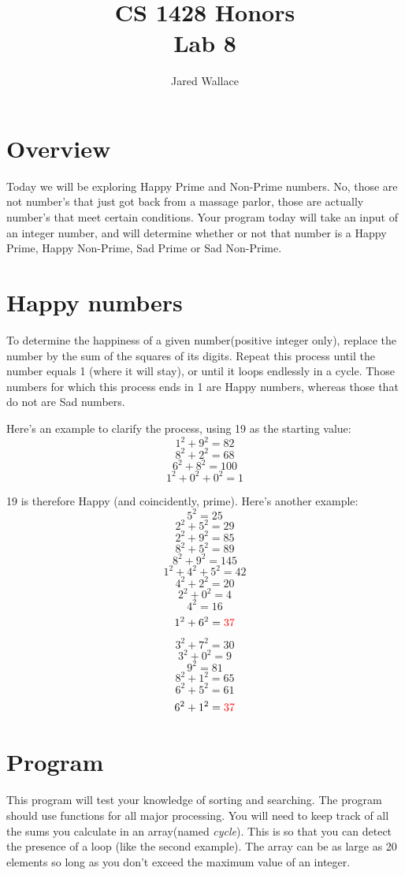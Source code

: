 \documentclass[letterpaper,12pt]{article}
\title{\Large CS 1428 Honors\\Lab 8}
\author{Jared Wallace}
\date{}
\begin{document}
\maketitle

\vspace{30mm}

\section*{Overview}
Today we will be exploring Happy Prime and Non-Prime numbers. No, those are not number's that
just got back from a massage parlor, those are actually number's that meet certain
conditions. Your program today will take an input of an integer number, and will
determine whether or not that number is a Happy Prime, Happy Non-Prime,
Sad Prime or Sad Non-Prime.

\section*{Happy numbers}
To determine the happiness of a given number(positive integer only), replace the number
by the sum of the squares of its digits. Repeat this process until the number equals 1
(where it will stay), or until it loops endlessly in a cycle. Those numbers for which
this process ends in 1 are Happy numbers, whereas those that do not are Sad numbers.

Here's an example to clarify the process, using 19 as the starting value:
$$1^{2} + 9^{2} = 82$$
$$8^{2} + 2^{2} = 68$$
$$6^{2} + 8^{2} = 100$$
$$1^{2} + 0^{2} + 0^{2} = 1$$

19 is therefore Happy (and coincidently, prime). Here's another example:
$$5^{2} = 25$$
$$2^{2} + 5^{2} = 29$$
$$2^{2} + 9^{2} = 85$$
$$8^{2} + 5^{2} = 89$$
$$8^{2} + 9^{2} = 145$$
$$1^{2} + 4^{2} + 5^{2} = 42$$
$$4^{2} + 2^{2} = 20$$
$$2^{2} + 0^{2} = 4$$
$$4^{2} = 16$$
$$1^{2} + 6^{2} = \textcolor{red}{37}$$
$$3^{2} + 7^{2} = 30$$
$$3^{2} + 0^{2} = 9$$
$$9^{2} = 81$$
$$8^{2} + 1^{2} = 65$$
$$6^{2} + 5^{2} = 61$$
$$6^{2} + 1^{2} = \textcolor{red}{37}$$

\section*{Program}
This program will test your knowledge of sorting and searching. The program
should use functions for all major processing.
You will need to keep track of all the sums you calculate in an array(named \emph{cycle}).
This is so that you can detect the presence of a loop (like the second example). The array 
can be as large as 20 elements so long as you don’t exceed the maximum
value of an integer.
\end{document}
